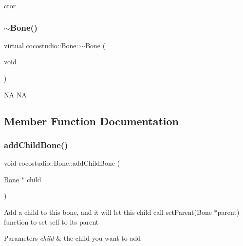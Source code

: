 ctor \mbox{\label{classcocostudio_1_1Bone_afcf24798154f0eaeee85ef60e0df7924}} 
\subsubsection{\texorpdfstring{$\sim$\+Bone()}{~Bone()}\hspace{0.1cm}{\footnotesize\ttfamily [2/2]}}
{\footnotesize\ttfamily virtual cocostudio\+::\+Bone\+::$\sim$\+Bone (\begin{DoxyParamCaption}\item[{void}]{ }\end{DoxyParamCaption})\hspace{0.3cm}{\ttfamily [virtual]}}

NA  NA 

\subsection{Member Function Documentation}
\mbox{\label{classcocostudio_1_1Bone_a0e2a59584601241d1f0cfbe5c3e240ca}} 
\subsubsection{\texorpdfstring{add\+Child\+Bone()}{addChildBone()}\hspace{0.1cm}{\footnotesize\ttfamily [1/2]}}
{\footnotesize\ttfamily void cocostudio\+::\+Bone\+::add\+Child\+Bone (\begin{DoxyParamCaption}\item[{\hyperlink{classcocostudio_1_1Bone}{Bone} $\ast$}]{child }\end{DoxyParamCaption})}

Add a child to this bone, and it will let this child call set\+Parent(\+Bone $\ast$parent) function to set self to it\textquotesingle{}s parent 
\begin{DoxyParams}{Parameters}
{\em child} & the child you want to add \\
\hline
\end{DoxyParams}
\mbox{\label{classcocostudio_1_1Bone_a0e2a59584601241d1f0cfbe5c3e240ca}} 
